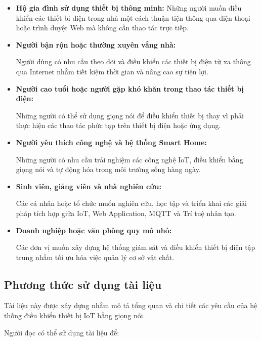 \documentclass[a4paper,12pt]{article}
\begin{document}
\begin{itemize}
\item \textbf{Hộ gia đình sử dụng thiết bị thông minh:}
Những người muốn điều khiển các thiết bị điện trong nhà một cách thuận tiện thông qua điện thoại hoặc trình duyệt Web mà không cần thao tác trực tiếp.

\item \textbf{Người bận rộn hoặc thường xuyên vắng nhà:}

Người dùng có nhu cầu theo dõi và điều khiển các thiết bị điện từ xa thông qua Internet nhằm tiết kiệm thời gian và nâng cao sự tiện lợi.

\item \textbf{Người cao tuổi hoặc người gặp khó khăn trong thao tác thiết bị điện:}

Những người có thể sử dụng giọng nói để điều khiển thiết bị thay vì phải thực hiện các thao tác phức tạp trên thiết bị điện hoặc ứng dụng.

\item \textbf{Người yêu thích công nghệ và hệ thống Smart Home:}

Những người có nhu cầu trải nghiệm các công nghệ IoT, điều khiển bằng giọng nói và tự động hóa trong môi trường sống hàng ngày.

\item \textbf{Sinh viên, giảng viên và nhà nghiên cứu:}

Các cá nhân hoặc tổ chức muốn nghiên cứu, học tập và triển khai các giải pháp tích hợp giữa IoT, Web Application, MQTT và Trí tuệ nhân tạo.

\item \textbf{Doanh nghiệp hoặc văn phòng quy mô nhỏ:}

Các đơn vị muốn xây dựng hệ thống giám sát và điều khiển thiết bị điện tập trung nhằm tối ưu hóa việc quản lý cơ sở vật chất.
\end{itemize}

\subsection{Phương thức sử dụng tài liệu}

Tài liệu này được xây dựng nhằm mô tả tổng quan và chi tiết các yêu cầu của hệ thống điều khiển thiết bị IoT bằng giọng nói.

Người đọc có thể sử dụng tài liệu để:
\end{document}
